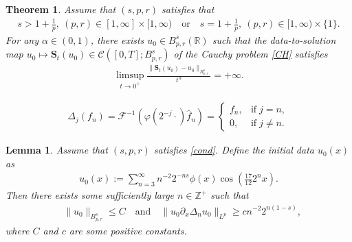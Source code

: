 \documentclass[10pt,a4paper]{amsart}
\newtheorem{theorem}{Theorem}
\newtheorem{lemma}{Lemma}
\newcommand{\De}{\Delta}
\newcommand{\R}{\mathbb{R}}
\newcommand{\bal}{\begin{align}}
\newcommand{\bbal}{\begin{align*}}
\newcommand{\f}{\left}
\newcommand{\g}{\right}
\newcommand{\pa}{\partial}
\begin{document}
\begin{theorem}\label{th1}
Assume that $(s,p,r)$ satisfies that
\bal\label{cond}
s>1+\frac1p, \ (p,r)\in[1,\infty]\times[1,\infty) \quad\text{or}\quad s=1+\frac1p, \ (p,r)\in[1,\infty)\times \{1\}.
\end{align}
For any $\alpha\in(0,1)$, there exists $u_0\in B^s_{p,r}(\R)$  such that the data-to-solution map $u_0\mapsto \mathbf{S}_{t}(u_0)\in \mathcal{C}([0,T];B^s_{p,r})$ of the Cauchy problem \eqref{CH}
satisfies
\bbal
\limsup_{t\to0^+}\frac{\|\mathbf{S}_{t}(u_0)-u_0\|_{B^s_{p,r}}}{t^\alpha}=+\infty.
\end{align*}
\end{theorem}

\begin{align}\label{cl}
{\Delta_j(f_n)=\mathcal{F}^{-1}\f(\varphi(2^{-j}\cdot)\widehat{f}_{n}\g)=}\begin{cases}
f_n, &\text{if}\; j=n,\\
0, &\text{if}\; j\neq n.
\end{cases}
\end{align}

\begin{lemma}\label{le5} Assume that $(s,p,r)$ satisfies \eqref{cond}.
Define the initial data $u_0(x)$ as
\bal\label{lyz-u0}
u_0(x):=\sum\limits^{\infty}_{n=3}n^{-2}2^{-ns} \phi(x)\cos \f(\frac{17}{12}2^{n}x\g).
\end{align}
Then there exists some sufficiently large $n\in \mathbb{Z}^+$  such that
\bbal
&\|u_0\|_{B^{s}_{p,r}}\leq C\quad\text{and}\quad \|u_0\pa_x\De_{n}u_0\|_{L^p}\geq cn^{-2}2^{n(1-s)},
\end{align*}
where $C$ and $c$ are some positive constants.
\end{lemma}
\end{document}
